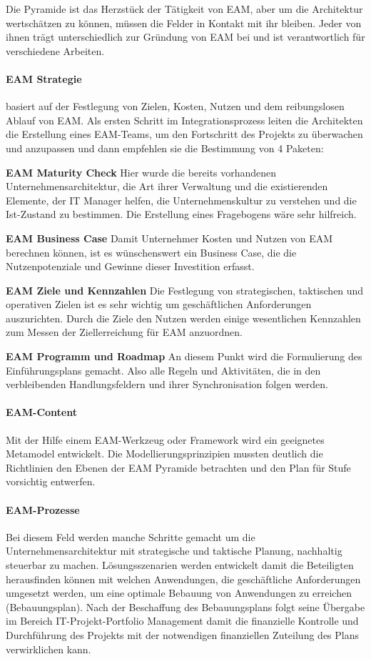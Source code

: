 \documentclass[
	A4paper,
	DIV=9,
	BCOR7mm,
	smallheadings,
	headinclude,
	footinclude,
	headsepline,
	parindent,
	german,
	captions=tableheading,
	abstracton
	]{scrreprt}
\begin{document}
Die Pyramide ist das Herzstück der Tätigkeit von EAM, aber um die Architektur wertschätzen zu können, müssen die Felder in Kontakt mit ihr bleiben. Jeder von ihnen trägt unterschiedlich zur Gründung von EAM bei und ist verantwortlich für verschiedene Arbeiten.


\paragraph{EAM Strategie}
basiert auf der Festlegung von Zielen, Kosten, Nutzen und dem reibungslosen Ablauf von EAM. Als ersten Schritt im Integrationsprozess leiten die Architekten die Erstellung eines EAM-Teams, um den Fortschritt des Projekts zu überwachen und anzupassen und dann empfehlen sie die Bestimmung von 4 Paketen:

\textbf{EAM Maturity Check}
Hier wurde die bereits vorhandenen Unternehmensarchitektur, die Art ihrer Verwaltung und die existierenden Elemente, der IT Manager helfen, die Unternehmenskultur zu verstehen und die Ist-Zustand zu bestimmen. Die Erstellung eines Fragebogens wäre sehr hilfreich.

\textbf{EAM Business Case}
Damit Unternehmer Kosten und Nutzen von EAM berechnen können, ist es wünschenswert ein Business Case, die die Nutzenpotenziale und Gewinne dieser Investition erfasst.

\textbf{EAM Ziele und Kennzahlen}
Die Festlegung von strategischen, taktischen und operativen Zielen ist es sehr wichtig um geschäftlichen Anforderungen auszurichten. Durch die Ziele den Nutzen werden einige wesentlichen Kennzahlen zum Messen der Ziellerreichung für EAM anzuordnen.

\textbf{EAM Programm und Roadmap}
An diesem Punkt wird die Formulierung des Einführungsplans gemacht. Also alle Regeln und Aktivitäten, die in den verbleibenden Handlungsfeldern und ihrer Synchronisation folgen werden.
\setlength{\leftskip}{0pt}

\paragraph{EAM-Content} Mit der Hilfe einem EAM-Werkzeug oder Framework wird ein geeignetes Metamodel entwickelt. Die Modellierungsprinzipien mussten deutlich die Richtlinien den Ebenen der EAM Pyramide betrachten und den Plan für Stufe vorsichtig entwerfen.

\paragraph{EAM-Prozesse} Bei diesem Feld werden manche Schritte gemacht um die Unternehmensarchitektur mit strategische und taktische Planung, nachhaltig steuerbar zu machen. Lösungsszenarien werden entwickelt damit die Beteiligten herausfinden können mit welchen Anwendungen, die geschäftliche Anforderungen umgesetzt werden, um eine optimale Bebauung von Anwendungen zu erreichen (Bebauungsplan).  Nach der Beschaffung des Bebauungsplans folgt seine Übergabe im Bereich IT-Projekt-Portfolio Management damit die finanzielle Kontrolle und Durchführung des Projekts mit der notwendigen finanziellen Zuteilung des Plans verwirklichen kann.
\end{document}
